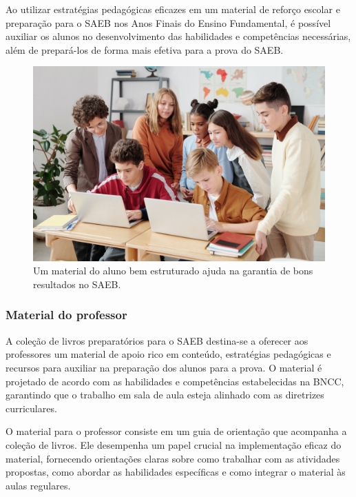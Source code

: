 Ao utilizar estratégias pedagógicas eficazes em um material de reforço
escolar e preparação para o SAEB nos Anos Finais do Ensino
Fundamental, é possível auxiliar os alunos no desenvolvimento das
habilidades e competências necessárias, além de prepará-los de forma
mais efetiva para a prova do SAEB.

\begin{figure}[t]
\centering
\includegraphics[width=\textwidth]{./imgs/Imagem009.jpg}
\caption{Um material do aluno bem estruturado ajuda na garantia de bons
resultados no SAEB.}
\end{figure}

\subsubsection{Material do professor}\label{material-do-professor}

A coleção de livros preparatórios para o SAEB destina-se a oferecer aos
professores um material de apoio rico em conteúdo, estratégias
pedagógicas e recursos para auxiliar na preparação dos alunos para a
prova. O material é projetado de acordo com as habilidades e
competências estabelecidas na BNCC, garantindo que o trabalho em sala de
aula esteja alinhado com as diretrizes curriculares.

O material para o professor consiste em um guia de orientação que
acompanha a coleção de livros. Ele desempenha um papel crucial na
implementação eficaz do material, fornecendo orientações claras sobre
como trabalhar com as atividades propostas, como abordar as habilidades
específicas e como integrar o material às aulas regulares.

